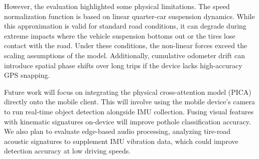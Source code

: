 \documentclass[conference]{IEEEtran}
\begin{document}
However, the evaluation highlighted some physical limitations. The speed normalization function is based on linear quarter-car suspension dynamics. While this approximation is valid for standard road conditions, it can degrade during extreme impacts where the vehicle suspension bottoms out or the tires lose contact with the road. Under these conditions, the non-linear forces exceed the scaling assumptions of the model. Additionally, cumulative odometer drift can introduce spatial phase shifts over long trips if the device lacks high-accuracy GPS snapping.

Future work will focus on integrating the physical cross-attention model (PICA) directly onto the mobile client. This will involve using the mobile device's camera to run real-time object detection alongside IMU collection. Fusing visual features with kinematic signatures on-device will improve pothole classification accuracy. We also plan to evaluate edge-based audio processing, analyzing tire-road acoustic signatures to supplement IMU vibration data, which could improve detection accuracy at low driving speeds.
\end{document}
